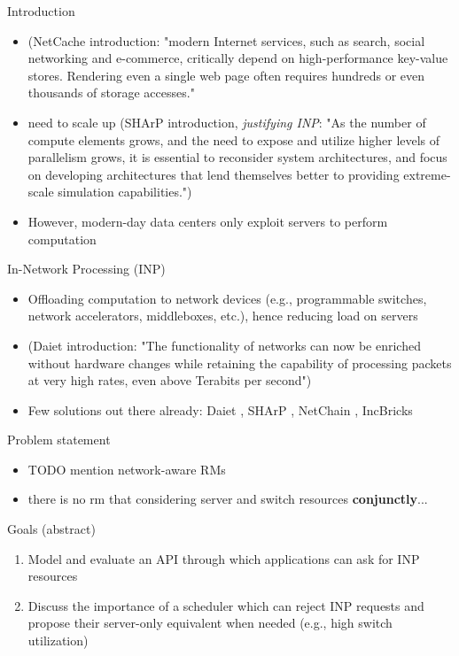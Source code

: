 \begin{frame}[fragile]{Introduction}
  \begin{itemize}
    \item (NetCache introduction: "modern Internet services, such as search, social networking and e-commerce, critically depend on high-performance key-value stores. Rendering even a single web page often requires hundreds or even thousands of storage accesses." \cite{netchain}
    \item need to scale up (SHArP introduction, \textit{justifying INP}: "As the number of compute elements grows, and the need to expose and utilize higher levels of parallelism grows, it is essential to reconsider system architectures, and focus on developing architectures that lend themselves better to providing extreme-scale simulation capabilities.") \cite{sharp}
    \item However, modern-day data centers only exploit servers to perform computation %
  \end{itemize}

\end{frame}
\begin{frame}[fragile]{In-Network Processing (INP)}
  \begin{itemize}
    \item Offloading computation to network devices (e.g., programmable switches, network accelerators, middleboxes, etc.), hence reducing load on servers
    \item (Daiet introduction: "The functionality of networks can now be enriched without hardware changes while retaining the capability of processing packets at very high rates, even above Terabits per second") \cite{daiet}
    \item Few solutions out there already: Daiet \cite{daiet}, SHArP \cite{sharp}, NetChain \cite{netchain}, IncBricks \cite{incbricks}
  \end{itemize}
\end{frame}
\begin{frame}[fragile]{Problem statement}
  \begin{itemize}
    \item TODO mention network-aware RMs %
    \item there is no \gls{rm} that considering server and switch resources \textbf{conjunctly}...
  \end{itemize}
\end{frame}
\begin{frame}[fragile]{Goals}
  (abstract)
  \begin{enumerate}
    \item Model and evaluate an API through which applications can ask for INP resources
    \item Discuss the importance of a scheduler which can reject INP requests and propose their server-only equivalent when needed (e.g., high switch utilization)
  \end{enumerate}
\end{frame}

